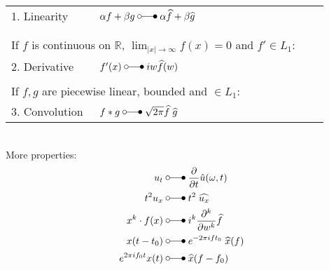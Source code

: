 \begin{tabular}[h]{p{0.25\linewidth} p{0.65\linewidth}}
    1. Linearity   & $\alpha f+\beta g\;\laplace\;\alpha\widehat{f}+\beta\widehat{g}$                                     \\
                   &                                                                                                      \\
                   &                                                                                                      \\
    \multicolumn{2}{p{0.9\linewidth}}{If $f$ is continuous on $\mathbb{R}$, $\lim_{|x|\to\infty}f(x)=0$ and $f'\in L_1$:} \\
    2. Derivative  & $f^{\prime}(x)\;\laplace\;iw\widehat{f}(w)$                                                          \\
                   &                                                                                                      \\
    \multicolumn{2}{p{0.9\linewidth}}{If $f,g$ are piecewise linear, bounded and $\in L_1$:}                              \\
    3. Convolution & $f*g\;\laplace\;\sqrt{2\pi}\widehat{f}\;\widehat{g}$                                                 \\
\end{tabular}\vspace*{8pt}\\
More properties:
\begin{align*}
    u_t                & \;\laplace\;\frac\partial{\partial t}\hat{u}(\omega,t)     \\
    t^2u_x             & \;\laplace\; t^2\;\widehat{u_x}                            \\
    x^k\cdot f(x)      & \;\laplace\;i^k \frac{\partial^k}{\partial w^k}\widehat{f} \\
    x(t-t_0)           & \;\laplace\; e^{-2\pi ift_0}\;\widehat{x}(f)               \\
    e^{2\pi if_0t}x(t) & \;\laplace\; \widehat{x}(f-f_0)
\end{align*}

